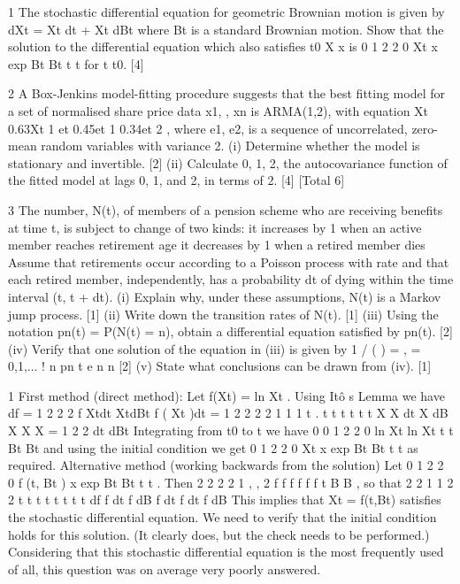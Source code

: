 \documentclass[a4paper,12pt]{article}
\begin{document}
\begin{enumerate}
1 The stochastic differential equation for geometric Brownian motion is given by
dXt = Xt dt + Xt dBt
where Bt is a standard Brownian motion. Show that the solution to the differential
equation which also satisfies
t0 X x is
0
1 2
2 0 Xt x exp Bt Bt t t
for t t0. [4]

2 A Box-Jenkins model-fitting procedure suggests that the best fitting model for a set of
normalised share price data x1, , xn is ARMA(1,2), with equation
Xt 0.63Xt 1 et 0.45et 1 0.34et 2 ,
where {e1, e2, } is a sequence of uncorrelated, zero-mean random variables with
variance 2.
(i) Determine whether the model is stationary and invertible. [2]
(ii) Calculate 0, 1, 2, the autocovariance function of the fitted model at lags 0, 1,
and 2, in terms of 2. [4]
[Total 6]

3 The number, N(t), of members of a pension scheme who are receiving benefits at time
t, is subject to change of two kinds:
it increases by 1 when an active member reaches retirement age
it decreases by 1 when a retired member dies
Assume that retirements occur according to a Poisson process with rate and that
each retired member, independently, has a probability dt of dying within the time
interval (t, t + dt).
(i) Explain why, under these assumptions, N(t) is a Markov jump process. [1]
(ii) Write down the transition rates of N(t). [1]
(iii) Using the notation pn(t) = P(N(t) = n), obtain a differential equation satisfied
by pn(t). [2]
(iv) Verify that one solution of the equation in (iii) is given by
1 /
( ) = , = 0,1,...
!
n
pn t e n
n
[2]
(v) State what conclusions can be drawn from (iv). [1]

1 First method (direct method):
Let f(Xt) = ln Xt . Using Itô s Lemma we have
df = 1 2 2
2 f Xtdt XtdBt f ( Xt )dt
= 1 2 2
2 2
1 1 1
t . t t t
t t t
X X dt X dB
X X X
= 1 2
2 dt dBt
Integrating from t0 to t we have
0 0
1 2
2 0 ln Xt ln Xt t t Bt Bt
and using the initial condition we get
0
1 2
2 0 Xt x exp Bt Bt t t as required.
Alternative method (working backwards from the solution)
Let
0
1 2
2 0 f (t, Bt ) x exp Bt Bt t t . Then
2
2 2
2
1
, ,
2
f f f
f f f
t B B
, so that
2 2 1 1
2 2 t t t t t t t t df f dt f dB f dt f dt f dB
This implies that Xt = f(t,Bt) satisfies the stochastic differential equation.
We need to verify that the initial condition holds for this solution. (It clearly does, but
the check needs to be performed.)
Considering that this stochastic differential equation is the most frequently used of all,
this question was on average very poorly answered.


\end{enumerate}
\end{document}
